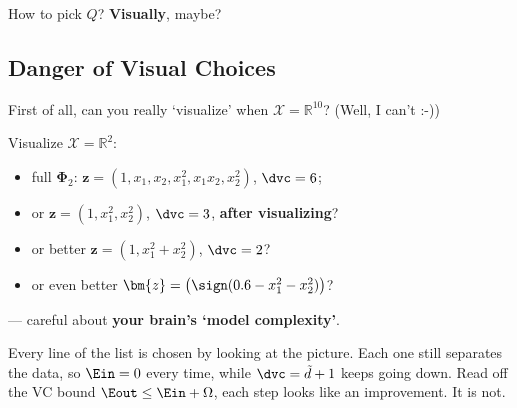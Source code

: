 \begin{question}
    How to pick \(Q\)? \textbf{Visually}, maybe?
\end{question}

\subsection{Danger of Visual Choices}\label{sec:visual-choices}

First of all, can you really `visualize' when \(\mathcal{X} =
\mathbb{R}^{10}\)? (Well, I can't :-))

\begin{center}
    \begin{minipage}[c]{0.66\textwidth}
        Visualize \(\mathcal{X} = \mathbb{R}^2\):
        \begin{itemize}
            \item full \(\bm{\Phi}_2\): \(\bm{z} = (1, x_1, x_2, x_1^2, x_1
                x_2, x_2^2)\), \(\dvc = 6\);
            \item or \(\bm{z} = (1, x_1^2, x_2^2)\), \(\dvc = 3\),
                \textbf{after visualizing}?
            \item or better \(\bm{z} = (1, x_1^2 + x_2^2)\), \(\dvc = 2\)?
            \item or even better \(\bm{z} = \bigl( \sign(0.6 - x_1^2 - x_2^2)
                \bigr)\)?
        \end{itemize}
        --- careful about \textbf{your brain's `model complexity'}.
    \end{minipage}%
    \hfill
    \begin{minipage}[c]{0.3\textwidth}
        \centering
    \end{minipage}
\end{center}

Every line of the list is chosen by looking at the picture. Each one still
separates the data, so \(\Ein = 0\) every time, while \(\dvc = \tilde{d} + 1\)
keeps going down. Read off the VC bound \(\Eout \le \Ein + \Omega\), each step
looks like an improvement. It is not.

